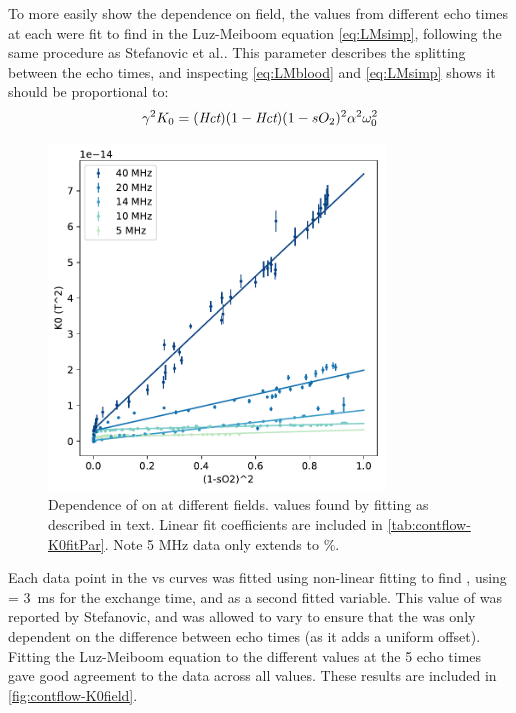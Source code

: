 To more easily show the dependence on field, the \Ttwo values from different echo times at each \SOtwo were fit to find \Kzero in the Luz-Meiboom equation \autoref{eq:LMsimp}, following the same procedure as Stefanovic et al.\cite{StefanovicHumanwholebloodrelaxometry2004}.
This parameter describes the splitting between the echo times, and inspecting \autoref{eq:LMblood} and \autoref{eq:LMsimp} shows it should be proportional to:
\begin{displaymath}
\gamma^2 K_0 = (\textit{Hct})(1-\textit{Hct})(1-sO_2)^2 \alpha^2 \omega_0^2
\end{displaymath}

\begin{figure}[tbh]
\centering
\includegraphics[width=0.8\textwidth]{figures/contflow/K0field.pdf}
\caption[Relationship between \Kzero on \SOtwo at different fields]{Dependence of \Kzero on \SOtwo at different fields. \Kzero values found by fitting as described in text. Linear fit coefficients are included in \autoref{tab:contflow-K0fitPar}. Note 5 MHz data only extends to \%.}
\label{fig:contflow-K0field}
\end{figure}

Each data point in the \Rtwo vs \SOtwo curves was fitted using non-linear fitting to find \Kzero, using  \Texc =  \SI{3}{ms} for the exchange time, and \TtwoO as a second fitted variable.
This value of \Texc was reported by Stefanovic\cite{StefanovicHumanwholebloodrelaxometry2004}, and \TtwoO was allowed to vary to ensure that the \Kzero was only dependent on the difference between echo times (as it adds a uniform offset).
Fitting the Luz-Meiboom equation to the different \Rtwo values at the 5 echo times gave good agreement to the data across all \SOtwo values.
These results are included in \autoref{fig:contflow-K0field}.

